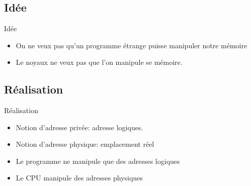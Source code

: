 \section{\sectitle}
\begin{frame}{\sectitle}
\def\subsectitle{Idée}
\subsection{\subsectitle}
\begin{block}{\subsectitle}
\begin{itemize}
    \item On ne veux pas qu'un programme étrange puisse manipuler notre mémoire
    \item Le noyaux ne veux pas que l'on manipule se mémoire.
\end{itemize}
\end{block}

\def\subsectitle{Réalisation}
\subsection{\subsectitle}
\begin{block}{\subsectitle}
\begin{itemize}
    \item Notion d'adresse privée: adresse logiques.
    \item Notion d'adresse physique: emplacement réel
    \item Le programme ne manipule que des adresses logiques
    \item Le CPU manipule des adresses physiques
\end{itemize}
\end{block}
\end{frame}


\def\sectitle{Allocation continue}
